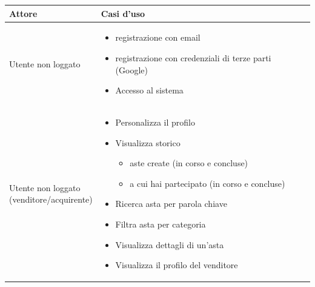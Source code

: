 {
	\setlength{\tabcolsep}{10pt} %
	\renewcommand{\arraystretch}{1.5} %

	\begin{tabular}{|l|p{330pt}|}
		\hline
		\textbf{Attore}    & \textbf{Casi d'uso}                                        \\ \hline
		Utente non loggato & \begin{itemize}[leftmargin=15pt]
			                     \setlength{\itemsep}{0pt}  %
			                     \setlength{\parskip}{0pt}  %
			                     \item registrazione con email
			                     \item registrazione con credenziali di terze parti (Google)
			                     \item Accesso al sistema
		                     \end{itemize} \\ \hline
		\makecell{Utente non loggato                                                    \\ (venditore/acquirente)} &
		\begin{itemize}[leftmargin=15pt]
			\setlength{\itemsep}{0pt}  %
			\setlength{\parskip}{0pt}  %
			\item Personalizza il profilo
			\item Visualizza storico
			      \begin{itemize}
				      \item aste create (in corso e concluse)
				      \item a cui hai partecipato (in corso e concluse)
			      \end{itemize}
			\item Ricerca asta per parola chiave
			\item Filtra asta per categoria
			\item Visualizza dettagli di un'asta
			\item Visualizza il profilo del venditore


\end{itemize}
\end{tabular}}
